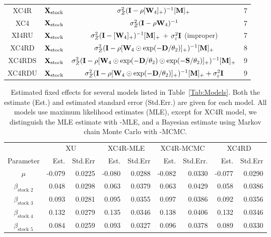 \documentclass[11pt, titlepage]{article}\usepackage[]{graphicx}\usepackage[]{color}
\begin{document}
\begin{spacing}{1.9}
\begin{flushleft}
\begin{table}[ht]
\begin{center}
\begin{tabular}{c|c|c|c}
  XC4R & $\mathbf{X}_{\textrm{stock}}$ & $\sigma_Z^2(\mathbf{I} - \rho[\mathbf{W}_4]_+)^{-1}[\mathbf{M}]_+$ & 7 \\
  XC4 & $\mathbf{X}_{\textrm{stock}}$ & $\sigma_Z^2(\mathbf{I} - \rho\mathbf{W}_{4})^{-1}$ & 7 \\
	XI4RU & $\mathbf{X}_{\textrm{stock}}$ & $\sigma_Z^2(\mathbf{I} - [\mathbf{W}_4]_+)^{-1}[\mathbf{M}]_+$ + $\sigma_\varepsilon^2\mathbf{I}$ (\textrm{improper}) & 7 \\
  XC4RD & $\mathbf{X}_{\textrm{stock}}$ & $\sigma_Z^2(\mathbf{I} - \rho[\mathbf{W}_{4}\odot\exp(-\mathbf{D}/\theta_2)]_{+})^{-1}[\mathbf{M}]_+$ & 8 \\
  XC4RDS & $\mathbf{X}_{\textrm{stock}}$ & $\sigma_Z^2(\mathbf{I} - \rho[\mathbf{W}_{4}\odot\exp(-\mathbf{D}/\theta_2)\odot\exp(-\mathbf{S}/\theta_2)]_{+})^{-1}[\mathbf{M}]_+$ & 9 \\
  XC4RDU & $\mathbf{X}_{\textrm{stock}}$ & $\sigma_Z^2(\mathbf{I} - \rho[\mathbf{W}_{4}\odot\exp(-\mathbf{D}/\theta_2)]_{+})^{-1}[\mathbf{M}]_+ + \sigma^2_\varepsilon\mathbf{I}$ & 9 \\
   \hline
\end{tabular}
\end{center}
\end{table}




\newpage
\begin{table}[ht]
				\caption{Estimated fixed effects for several models listed in Table~\ref{Tab:Models}. Both the estimate (Est.) and estimated standard error (Std.Err.) are given for each model. All models use maximum likelihood estimates (MLE), except for XC4R model, we distinguish the MLE estimate with -MLE, and a Bayesian estimate using Markov chain Monte Carlo with -MCMC.  \label{Tab:Coeff}}
\begin{center}
\begin{tabular}{c|rr|rr|rr|rr}
  \hline
  \hline
  & \multicolumn{2}{|c|}{XU} & \multicolumn{2}{|c|}{XC4R-MLE}  
  & \multicolumn{2}{|c|}{XC4R-MCMC} & \multicolumn{2}{|c}{XC4RD} \\
  Parameter & Est. & Std.Err & Est. & Std.Err & Est. & Std.Err. & Est. & Std.Err \\
  \hline
$\mu$ & -0.079 & 0.0225 & -0.080 & 0.0288 & -0.082 & 0.0330 & -0.077 & 0.0290 \\ 
  $\beta_{\textrm{stock 2}}$ & 0.048 & 0.0298 & 0.063 & 0.0379 & 0.063 & 0.0429 & 0.058 & 0.0386 \\ 
  $\beta_{\textrm{stock 3}}$ & 0.093 & 0.0281 & 0.095 & 0.0355 & 0.097 & 0.0386 & 0.092 & 0.0356 \\ 
  $\beta_{\textrm{stock 4}}$ & 0.132 & 0.0279 & 0.135 & 0.0346 & 0.138 & 0.0406 & 0.132 & 0.0346 \\ 
  $\beta_{\textrm{stock 5}}$ & 0.084 & 0.0259 & 0.093 & 0.0327 & 0.096 & 0.0378 & 0.089 & 0.0330 \\ 
   \hline


\end{tabular}
\end{center}
\end{table}
\end{flushleft}
\end{spacing}
\end{document}
